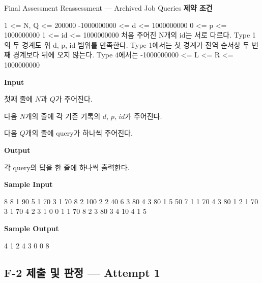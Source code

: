 \begin{problembox}{Final Assessment Reassessment --- Archived Job Queries}
\textbf{제약 조건}
\begin{TextBlock}
1 <= N, Q <= 200000
-1000000000 <= d <= 1000000000
0 <= p <= 1000000000
1 <= id <= 1000000000
처음 주어진 N개의 id는 서로 다르다.
Type 1의 두 경계도 위 d, p, id 범위를 만족한다.
Type 1에서는 첫 경계가 전역 순서상 두 번째 경계보다 뒤에 오지 않는다.
Type 4에서는 -1000000000 <= L <= R <= 1000000000
\end{TextBlock}

\textbf{Input}

첫째 줄에 $N$과 $Q$가 주어진다.

다음 $N$개의 줄에 각 기존 기록의 $d$, $p$, $id$가 주어진다.

다음 $Q$개의 줄에 query가 하나씩 주어진다.

\textbf{Output}

각 query의 답을 한 줄에 하나씩 출력한다.

\textbf{Sample Input}
\begin{TextBlock}
8 8
1 90 5
1 70 3
1 70 8
2 100 2
2 40 6
3 80 4
3 80 1
5 50 7
1 1 70 4 3 80 1
2 1 70
3 1 70
4 2 3
1 0 0 1 1 70 8
2 3 80
3 4 10
4 1 5
\end{TextBlock}

\textbf{Sample Output}
\begin{TextBlock}
4
1
2
4
3
0
0
8
\end{TextBlock}
\end{problembox}


\subsection{F-2 제출 및 판정 --- Attempt 1}

